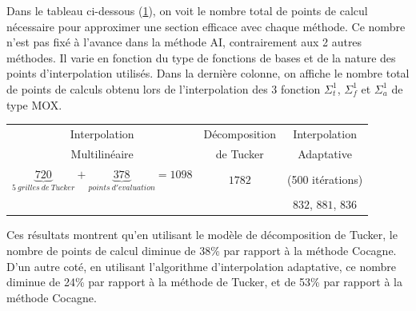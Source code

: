 Dans le tableau ci-dessous (\ref{table:nbpointscalcul}), on voit le nombre total de points de calcul nécessaire pour approximer une section efficace avec chaque méthode. Ce nombre n'est pas fixé à l'avance dans la méthode AI, contrairement aux 2 autres méthodes. Il varie en fonction du type de fonctions de bases et de la nature des points d'interpolation utilisés. Dans la dernière colonne, on affiche le nombre total de points de calculs obtenu lors de l'interpolation des 3 fonction $\Sigma_t^1$, $\Sigma_f^1$ et $\Sigma_a^1$ de type MOX.
\begin{center}
\begin{table}[!h]
\begin{tabular}{|*{3}{c|}}
	\hline
	Interpolation     																																						& Décomposition  	& Interpolation  			\\
	Multilinéaire																																									& de Tucker				& Adaptative					\\
	\hline
	$\underbrace{720}_{5\ grilles\ de\ Tucker} + \underbrace{378}_{points\ d'evaluation} = 1098$	& $1782$					& 	(500 itérations)  \\
																																																&									&	$832$, $881$, $836$	\\
	\hline
\end{tabular}
\label{table:nbpointscalcul}
\end{table}
\end{center}

\newpage
\hspace{0.5cm} Ces résultats montrent qu'en utilisant le modèle de décomposition de Tucker, le nombre de points de calcul diminue de 38\% par rapport à la méthode Cocagne. D'un autre coté, en utilisant l'algorithme d'interpolation adaptative, ce nombre diminue de 24\% par rapport à la méthode de Tucker, et de 53\% par rapport à la méthode Cocagne.

